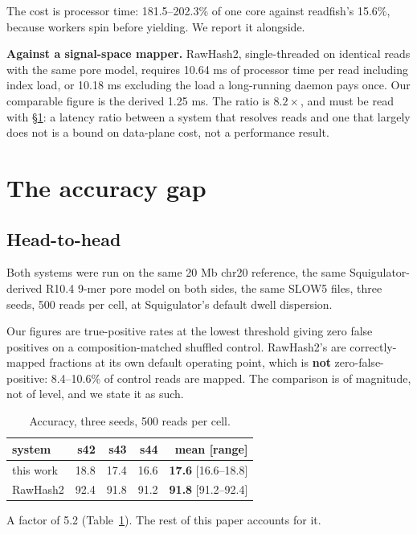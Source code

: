 \documentclass[sigconf,nonacm]{acmart}
\begin{document}
The cost is processor time: 181.5--202.3\% of one core against readfish's 15.6\%, because
workers spin before yielding. We report it alongside.

\textbf{Against a signal-space mapper.} RawHash2, single-threaded on identical reads with the
same pore model, requires 10.64 ms of processor time per read including index load, or 10.18 ms
excluding the load a long-running daemon pays once. Our comparable figure is the derived
1.25 ms. The ratio is $8.2\times$, and must be read with \S\ref{sec:gap}: a latency ratio between a
system that resolves reads and one that largely does not is a bound on data-plane cost, not a
performance result.

\section{The accuracy gap}
\label{sec:gap}

\subsection{Head-to-head}

Both systems were run on the same 20 Mb chr20 reference, the same Squigulator-derived R10.4
9-mer pore model on both sides, the same SLOW5 files, three seeds, 500 reads per cell, at
Squigulator's default dwell dispersion.

Our figures are true-positive rates at the lowest threshold giving zero false positives on a
composition-matched shuffled control. RawHash2's are correctly-mapped fractions at its own
default operating point, which is \textbf{not} zero-false-positive: 8.4--10.6\% of control reads
are mapped. The comparison is of magnitude, not of level, and we state it as such.

\begin{table}[t]
\caption{Accuracy, three seeds, 500 reads per cell.}
\label{tab:acc}
\small
\begin{tabular}{lrrrr}
\toprule
system & s42 & s43 & s44 & mean [range] \\
\midrule
this work  & 18.8 & 17.4 & 16.6 & \textbf{17.6} [16.6--18.8] \\
RawHash2   & 92.4 & 91.8 & 91.2 & \textbf{91.8} [91.2--92.4] \\
\bottomrule
\end{tabular}
\end{table}

A factor of 5.2 (Table~\ref{tab:acc}). The rest of this paper accounts for it.
\end{document}

